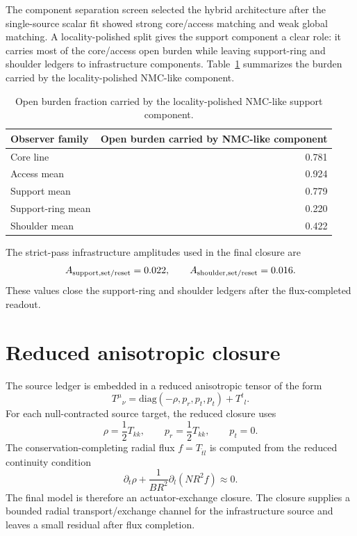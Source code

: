 \documentclass[11pt]{article}
\begin{document}
The component separation screen selected the hybrid architecture after the single-source scalar fit showed strong core/access matching and weak global matching.  A locality-polished split gives the support component a clear role: it carries most of the core/access open burden while leaving support-ring and shoulder ledgers to infrastructure components.  Table~\ref{tab:nmc_carry} summarizes the burden carried by the locality-polished NMC-like component.

\begin{table}[ht]
\centering
\caption{Open burden fraction carried by the locality-polished NMC-like support component.}
\label{tab:nmc_carry}
\begin{tabular}{lr}
\toprule
Observer family & Open burden carried by NMC-like component \\
\midrule
Core line & 0.781 \\
Access mean & 0.924 \\
Support mean & 0.779 \\
Support-ring mean & 0.220 \\
Shoulder mean & 0.422 \\
\bottomrule
\end{tabular}
\end{table}

The strict-pass infrastructure amplitudes used in the final closure are
\begin{equation}
 A_{\rm support,set/reset}=0.022,
 \qquad
 A_{\rm shoulder,set/reset}=0.016.
 \label{eq:strict_amplitudes}
\end{equation}
These values close the support-ring and shoulder ledgers after the flux-completed readout.

\section{Reduced anisotropic closure}

The source ledger is embedded in a reduced anisotropic tensor of the form
\begin{equation}
 T^\mu{}_{\nu}=\mathrm{diag}(-\rho,p_r,p_t,p_t)+T^t{}_l.
 \label{eq:aniso_tensor}
\end{equation}
For each null-contracted source target, the reduced closure uses
\begin{equation}
 \rho=\frac{1}{2}T_{kk},
 \qquad
 p_r=\frac{1}{2}T_{kk},
 \qquad
 p_t=0.
 \label{eq:rho_pr}
\end{equation}
The conservation-completing radial flux $f=T_{\hat t\hat l}$ is computed from the reduced continuity condition
\begin{equation}
 \partial_t\rho+
 \frac{1}{BR^2}\partial_l(NR^2 f)\approx0.
 \label{eq:continuity}
\end{equation}
The final model is therefore an actuator-exchange closure.  The closure supplies a bounded radial transport/exchange channel for the infrastructure source and leaves a small residual after flux completion.
\end{document}
